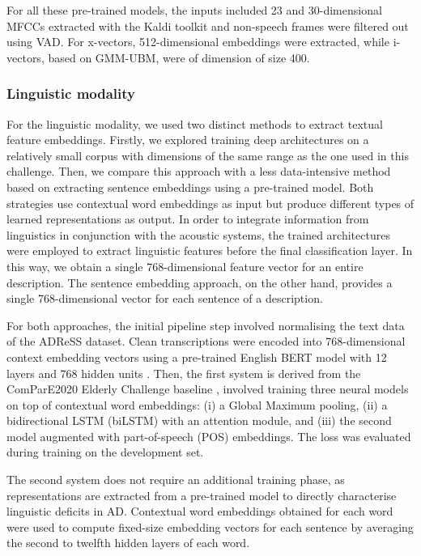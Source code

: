 For all these pre-trained models, the inputs included 23 and 30-dimensional \acp{MFCC} extracted with the Kaldi toolkit \cite{kaldi} and non-speech frames were filtered out using \ac{VAD}. For x-vectors, 512-dimensional embeddings were extracted, while i-vectors, based on \ac{GMM-UBM}, were of dimension of size 400.

\subsubsection{Linguistic modality}
For the linguistic modality, we used two distinct methods to extract textual feature embeddings. Firstly, we explored training deep architectures on a relatively small corpus with dimensions of the same range as the one used in this challenge. Then, we compare this approach with a less data-intensive method based on extracting sentence embeddings using a pre-trained model. Both strategies use contextual word embeddings as input but produce different types of learned representations as output. In order to integrate information from linguistics in conjunction with the acoustic systems, the trained architectures were employed to extract linguistic features before the final classification layer. In this way, we obtain a single 768-dimensional feature vector for an entire description. The sentence embedding approach, on the other hand, provides a single 768-dimensional vector for each sentence of a description.

For both approaches, the initial pipeline step involved normalising the text data of the ADReSS dataset. Clean transcriptions were encoded into 768-dimensional context embedding vectors using a pre-trained English BERT model with 12 layers and 768 hidden units \cite{Bert}. Then, the first system is derived from the ComParE2020 Elderly Challenge baseline \cite{schuller2020interspeech}, involved training three neural models on top of contextual word embeddings: (i) a Global Maximum pooling, (ii) a bidirectional \ac{LSTM} (biLSTM) with an attention module, and (iii) the second model augmented with part-of-speech (POS) embeddings. The loss was evaluated during training on the development set.

The second system does not require an additional training phase, as representations are extracted from a pre-trained model to directly characterise linguistic deficits in \ac{AD}. Contextual word embeddings obtained for each word were used to compute fixed-size embedding vectors for each sentence by averaging the second to twelfth hidden layers of each word.

